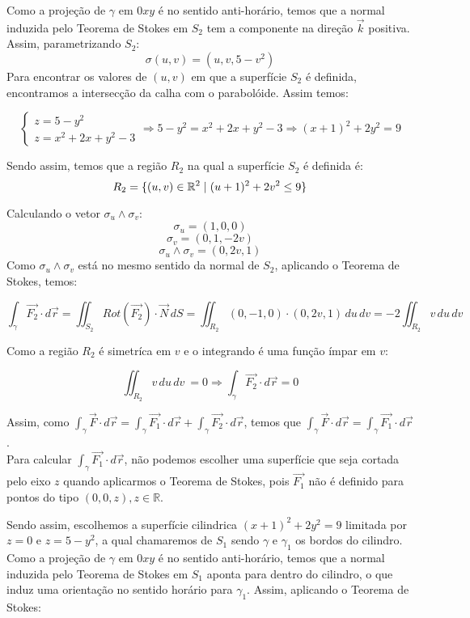 \documentclass[12pt,a4paper]{article}
\begin{document}
Como a projeção de $\gamma $ em $0xy$ é no sentido anti-horário, temos que a normal induzida pelo Teorema de Stokes em $S_2$ tem a componente na direção $\vec{k}$ positiva. Assim, parametrizando $S_2$:
$$ \sigma (u,v) = (u,v, 5-v^2) $$
Para encontrar os valores de $(u,v)$ em que a superfície $S_2$ é definida, encontramos a intersecção da calha com o parabolóide. Assim temos:

$$\begin{cases}
z = 5 - y^2 \\
z = x^2 + 2x + y^2 - 3
\end{cases}
\Rightarrow
5 - y^2 = x^2 + 2x + y^2 - 3 \Rightarrow (x+1)^2 + 2y^2 = 9 $$

Sendo assim, temos que a região $R_2$ na qual a superfície $S_2$ é definida é: \\
$$ R_2 = \{ (u,v) \in \mathbb{R}^2 \hspace{1 mm} | \hspace{1 mm}  (u+1)^2 + 2v^2 \leq 9 \} $$

Calculando o vetor $\sigma_{u} \wedge \sigma_{v}$:
$$ \sigma_u = (1,0, 0 ) $$
$$ \sigma_v = (0,1, -2v ) $$
$$  \sigma_u \wedge \sigma_v = (0 , 2v, 1 ) $$
Como $\sigma_u \wedge \sigma_v$ está no mesmo sentido da normal de $S_2$, aplicando o Teorema de Stokes, temos:

$$ \int_{\gamma} \vec{F_2} \cdot d\vec{r} = \iint_{S_2} Rot(\vec{F_2}) \cdot \vec{N} \,dS = \iint_{R_2} ( 0, -1, 0 )  \cdot ( 0, 2v, 1 )  \,du \,dv = -2 \iint_{R_2} v \,du \,dv $$

Como a região $R_2$ é simetríca em $v$ e o integrando é uma função ímpar em $v$:

$$ \iint_{R_2} v \,du \,dv\ = 0 \Rightarrow  \int_{\gamma} \vec{F_2} \cdot d\vec{r} = 0 $$

Assim, como $ \displaystyle  \int_{\gamma} \vec{F} \cdot d\vec{r} =  \int_{\gamma} \vec{F_1} \cdot d\vec{r} +  \int_{\gamma} \vec{F_2} \cdot d\vec{r} $, temos que $ \displaystyle \int_{\gamma} \vec{F} \cdot d\vec{r} =  \int_{\gamma} \vec{F_1} \cdot d\vec{r} $. \\

Para calcular $ \displaystyle \int_{\gamma} \vec{F_1} \cdot d\vec{r} $, não podemos escolher uma superfície que seja cortada pelo eixo $z$ quando aplicarmos o Teorema de Stokes, pois $\vec{F_1}$ não é definido para pontos do tipo $(0,0,z), z \in \mathbb{R} $.

Sendo assim, escolhemos a superfície cilindrica $(x+1)^2 + 2y^2 = 9$ limitada por $z = 0 $ e $z = 5 - y^2 $, a qual chamaremos de $S_1$ sendo $\gamma$ e $\gamma_1$ os bordos do cilindro. Como a projeção de $\gamma $ em $0xy$ é no sentido anti-horário, temos que a normal induzida pelo Teorema de Stokes em $S_1$ aponta para dentro do cilindro, o que induz uma orientação no sentido horário para $ \gamma_1$. Assim, aplicando o Teorema de Stokes:
\end{document}
